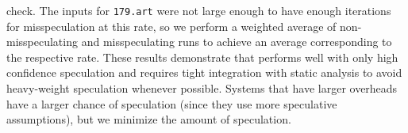 check.
The inputs for \texttt{179.art} were not large enough to have
enough iterations for misspeculation at this rate, so we perform a
weighted average of non-misspeculating and misspeculating runs to achieve
an average corresponding to the respective rate.
These results demonstrate that \name performs well with only high
confidence speculation and requires tight integration with static analysis
to avoid heavy-weight speculation whenever possible.
Systems that have larger overheads have a larger chance of speculation (since
they use more speculative assumptions), but we minimize the amount of speculation.



